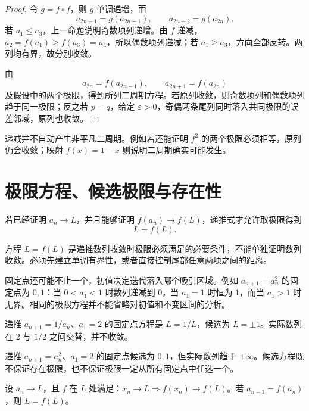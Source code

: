 \begin{proof}
令 \(g=f\circ f\)，则 \(g\) 单调递增，而
\[
 a_{2n+1}=g(a_{2n-1}),\qquad a_{2n+2}=g(a_{2n}).
\]
若 \(a_1\le a_3\)，上一命题说明奇数项列递增。由 \(f\) 递减，
\(a_2=f(a_1)\ge f(a_3)=a_4\)，所以偶数项列递减；若
\(a_1\ge a_3\)，方向全部反转。两列均有界，故分别收敛。

由
\[
 a_{2n}=f(a_{2n-1}),\qquad
 a_{2n+1}=f(a_{2n})
\]
及假设中的两个极限，得到所列二周期方程。若原列收敛，则奇数项列和偶数项列趋于同一极限；反之若 \(p=q\)，给定 \(\varepsilon>0\)，奇偶两条尾列同时落入共同极限的误差邻域，原列也收敛。
\end{proof}

递减并不自动产生非平凡二周期。例如若还能证明 \(f^2\) 的两个极限必须相等，原列仍会收敛；映射 \(f(x)=1-x\) 则说明二周期确实可能发生。

\section{极限方程、候选极限与存在性}


若已经证明 \(a_n\to L\)，并且能够证明 \(f(a_n)\to f(L)\)，递推式才允许取极限得到
\[
 L=f(L).
\]
\begin{warningbox}[固定点方程只给出候选极限]
方程 \(L=f(L)\) 是递推数列收敛时极限必须满足的必要条件，不能单独证明数列收敛。必须先建立单调有界性，或者直接控制尾部任意两项之间的距离。
\end{warningbox}

固定点还可能不止一个，初值决定迭代落入哪个吸引区域。例如 \(a_{n+1}=a_n^2\) 的固定点为 \(0,1\)：当 \(0<a_1<1\) 时数列递减到 \(0\)，当 \(a_1=1\) 时恒为 \(1\)，而当 \(a_1>1\) 时无界。相同的极限方程并不能省略对初值和不变区间的分析。

\begin{counterexample}
递推 \(a_{n+1}=1/a_n\)、\(a_1=2\) 的固定点方程是 \(L=1/L\)，候选为 \(L=\pm1\)。实际数列在 \(2\) 与 \(1/2\) 之间交替，并不收敛。
\end{counterexample}

\begin{counterexample}
递推 \(a_{n+1}=a_n^2\)、\(a_1=2\) 的固定点候选为 \(0,1\)，但实际数列趋于 \(+\infty\)。候选方程既不保证存在极限，也不保证极限一定从所有固定点中任选一个。
\end{counterexample}

\begin{proposition}
设 \(a_n\to L\)，且 \(f\) 在 \(L\) 处满足：\(x_n\to L\Rightarrow f(x_n)\to f(L)\)。若 \(a_{n+1}=f(a_n)\)，则 \(L=f(L)\)。
\end{proposition}

